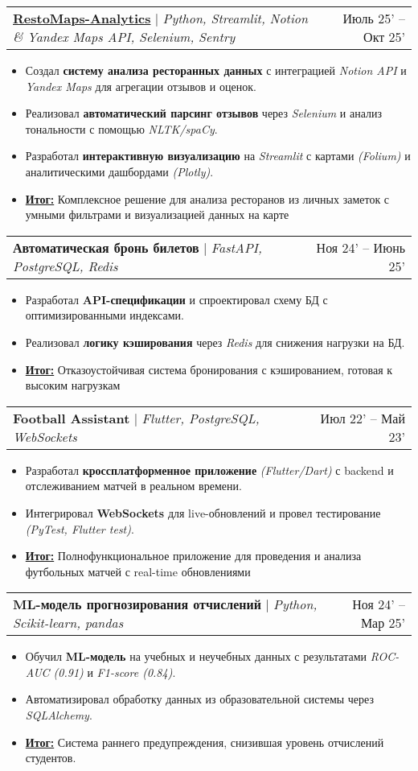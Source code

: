 \documentclass[letterpaper,11pt]{article}
\makeatletter
\newcommand{\resumeItem}[1]{
  \item\small{
    {#1 \vspace{-2pt}}
  }
}
\newcommand{\resumeProjectHeading}[2]{
    \item
    \begin{tabular*}{0.97\textwidth}{l@{\extracolsep{\fill}}r}
      \small#1 & #2 \\
    \end{tabular*}\vspace{-7pt}
}
\newcommand{\resumeItemListStart}{\begin{itemize}}
\newcommand{\resumeItemListEnd}{\end{itemize}\vspace{-5pt}}
\makeatother
\begin{document}
    \resumeProjectHeading
    {\href{https://github.com/GordeyZuev/RestoMaps-Analytics}{\textcolor{blue!50!black}{\textbf{RestoMaps-Analytics}}} $|$ \emph{Python, Streamlit, Notion \& Yandex Maps API, Selenium, Sentry}}{Июль 25' -- Окт 25'}
    \resumeItemListStart
        \resumeItem{Создал \textbf{систему анализа ресторанных данных} с интеграцией \textit{Notion API} и \textit{Yandex Maps} для агрегации отзывов и оценок.}
        \resumeItem{Реализовал \textbf{автоматический парсинг отзывов} через \textit{Selenium} и анализ тональности с помощью \textit{NLTK/spaCy}.}
        \resumeItem{Разработал \textbf{интерактивную визуализацию} на \textit{Streamlit} с картами \textit{(Folium)} и аналитическими дашбордами \textit{(Plotly)}.}
        \resumeItem{\underline{\textbf{Итог:}} Комплексное решение для анализа ресторанов из личных заметок с умными фильтрами и визуализацией данных на карте}
    \resumeItemListEnd

    \resumeProjectHeading
    {\textbf{Автоматическая бронь билетов} $|$ \emph{FastAPI, PostgreSQL, Redis}}{Ноя 24' -- Июнь 25'}
    \resumeItemListStart
        \resumeItem{Разработал \textbf{API-спецификации} и спроектировал схему БД с оптимизированными индексами.}
        \resumeItem{Реализовал \textbf{логику кэширования} через \textit{Redis} для снижения нагрузки на БД.}
        \resumeItem{\underline{\textbf{Итог:}} Отказоустойчивая система бронирования с кэшированием, готовая к высоким нагрузкам}
    \resumeItemListEnd

    \resumeProjectHeading
    {\textbf{Football Assistant} $|$ \emph{Flutter, PostgreSQL, WebSockets}}{Июл 22' -- Май 23'}
    \resumeItemListStart
        \resumeItem{Разработал \textbf{кроссплатформенное приложение} \textit{(Flutter/Dart)} с backend и отслеживанием матчей в реальном времени.}
        \resumeItem{Интегрировал \textbf{WebSockets} для live-обновлений и провел тестирование \textit{(PyTest, Flutter test)}.}
        \resumeItem{\underline{\textbf{Итог:}} Полнофункциональное приложение для проведения и анализа футбольных матчей с real-time обновлениями}
    \resumeItemListEnd

    \resumeProjectHeading
    {\textbf{ML-модель прогнозирования отчислений} $|$ \emph{Python, Scikit-learn, pandas}}{Ноя 24' -- Мар 25'}
    \resumeItemListStart
        \resumeItem{Обучил \textbf{ML-модель} на учебных и неучебных данных с результатами \textit{ROC-AUC (0.91)} и \textit{F1-score (0.84)}.}
        \resumeItem{Автоматизировал обработку данных из образовательной системы через \textit{SQLAlchemy}.}
        \resumeItem{\underline{\textbf{Итог:}} Система раннего предупреждения, снизившая уровень отчислений студентов.}
    \resumeItemListEnd
\end{document}
